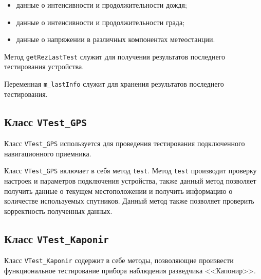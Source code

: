 \begin{enum}
\begin{itemize}
			\item данные о интенсивности и продолжительности дождя;
			\item данные о интенсивности и продолжительности града;
			\item данные о напряжении в различных компонентах метеостанции.
		\end{itemize}
	\item Метод \texttt{getRezLastTest} служит для получения результатов последнего тестирования устройства.
	\item Переменная \texttt{m\_lastInfo} служит для хранения результатов последнего тестирования.
\end{enum}

\subsection{Класс \texttt{VTest\_GPS}}
Класс \texttt{VTest\_GPS} используется для проведения тестирования подключенного навигационного приемника.

Класс \texttt{VTest\_GPS} включает в себя метод \texttt{test}. Метод \texttt{test} производит проверку настроек и параметров подключения устройства, также данный метод
позволяет получить данные о текущем местоположении и получить информацию о количестве используемых
спутников. Данный метод также позволяет проверить корректность полученных данных.

\subsection{Класс \texttt{VTest\_Kaponir}}
Класс \texttt{VTest\_Kaponir} содержит в себе методы, позволяющие произвести функциональное тестирование прибора
наблюдения разведчика <<Капонир>>.

